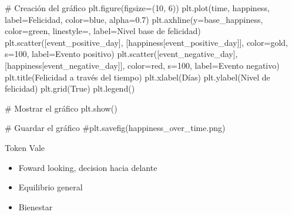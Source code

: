 \documentclass[
  stu,
  floatsintext,
  longtable,
  a4paper,
  nolmodern,
  notxfonts,
  notimes,
  12pt,
  colorlinks=true,linkcolor=blue,citecolor=blue,urlcolor=blue]{apa7}
\newenvironment{Shaded}{\begin{snugshade}}{\end{snugshade}}
\newcommand{\CommentTok}[1]{\textcolor[rgb]{0.37,0.37,0.37}{#1}}
\newcommand{\DecValTok}[1]{\textcolor[rgb]{0.68,0.00,0.00}{#1}}
\newcommand{\FloatTok}[1]{\textcolor[rgb]{0.68,0.00,0.00}{#1}}
\newcommand{\NormalTok}[1]{\textcolor[rgb]{0.00,0.23,0.31}{#1}}
\newcommand{\OperatorTok}[1]{\textcolor[rgb]{0.37,0.37,0.37}{#1}}
\newcommand{\StringTok}[1]{\textcolor[rgb]{0.13,0.47,0.30}{#1}}
\newcommand{\VariableTok}[1]{\textcolor[rgb]{0.07,0.07,0.07}{#1}}
\providecommand{\tightlist}{%
  \setlength{\itemsep}{0pt}\setlength{\parskip}{0pt}}
\begin{document}
\begin{Shaded}
\begin{Highlighting}[]
\CommentTok{\# Creación del gráfico}
\NormalTok{plt.figure(figsize}\OperatorTok{=}\NormalTok{(}\DecValTok{10}\NormalTok{, }\DecValTok{6}\NormalTok{))}
\NormalTok{plt.plot(time, happiness, label}\OperatorTok{=}\StringTok{\textquotesingle{}Felicidad\textquotesingle{}}\NormalTok{, color}\OperatorTok{=}\StringTok{\textquotesingle{}blue\textquotesingle{}}\NormalTok{, alpha}\OperatorTok{=}\FloatTok{0.7}\NormalTok{)}
\NormalTok{plt.axhline(y}\OperatorTok{=}\NormalTok{base\_happiness, color}\OperatorTok{=}\StringTok{\textquotesingle{}green\textquotesingle{}}\NormalTok{, linestyle}\OperatorTok{=}\StringTok{\textquotesingle{}{-}{-}\textquotesingle{}}\NormalTok{, label}\OperatorTok{=}\StringTok{\textquotesingle{}Nivel base de felicidad\textquotesingle{}}\NormalTok{)}
\NormalTok{plt.scatter([event\_positive\_day], [happiness[event\_positive\_day]], color}\OperatorTok{=}\StringTok{\textquotesingle{}gold\textquotesingle{}}\NormalTok{, s}\OperatorTok{=}\DecValTok{100}\NormalTok{, label}\OperatorTok{=}\StringTok{\textquotesingle{}Evento positivo\textquotesingle{}}\NormalTok{)}
\NormalTok{plt.scatter([event\_negative\_day], [happiness[event\_negative\_day]], color}\OperatorTok{=}\StringTok{\textquotesingle{}red\textquotesingle{}}\NormalTok{, s}\OperatorTok{=}\DecValTok{100}\NormalTok{, label}\OperatorTok{=}\StringTok{\textquotesingle{}Evento negativo\textquotesingle{}}\NormalTok{)}
\NormalTok{plt.title(}\StringTok{\textquotesingle{}Felicidad a través del tiempo\textquotesingle{}}\NormalTok{)}
\NormalTok{plt.xlabel(}\StringTok{\textquotesingle{}Días\textquotesingle{}}\NormalTok{)}
\NormalTok{plt.ylabel(}\StringTok{\textquotesingle{}Nivel de felicidad\textquotesingle{}}\NormalTok{)}
\NormalTok{plt.grid(}\VariableTok{True}\NormalTok{)}
\NormalTok{plt.legend()}

\CommentTok{\# Mostrar el gráfico}
\NormalTok{plt.show()}

\CommentTok{\# Guardar el gráfico}
\CommentTok{\#plt.savefig(\textquotesingle{}happiness\_over\_time.png\textquotesingle{})}
\end{Highlighting}
\end{Shaded}

Token Vale

\begin{itemize}
\tightlist
\item
  Foward looking, decision hacia delante
\item
  Equilibrio general
\item
  Bienestar
\end{itemize}
\end{document}
